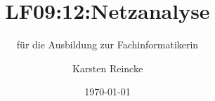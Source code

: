 \documentclass[]{beamer}
\title{LF09:12:Netzanalyse}
\subtitle{für die Ausbildung zur Fachinformatikerin}
\institute{GS-LDK}
\author{Karsten Reincke}
\date{\today}
\def\cfgGl{../../../cfg.gl/}
\begin{document}

\begin{frame}
  \titlepage
\end{frame}






\logo{}
\newpage



%
\end{document}
